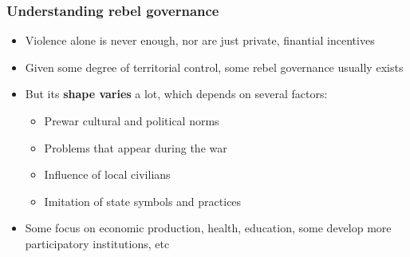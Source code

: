 \documentclass[utf8, xcolor=dvipsnames]{beamer}
\begin{document}
\begin{frame}
\frametitle{Understanding rebel governance}
\centering

\begin{itemize}[<+->]
  \item Violence alone is never enough, nor are just private, finantial incentives
  \item Given some degree of territorial control, some rebel governance usually exists
  \item But its \textbf{shape varies} a lot, which depends on several factors:
  \begin{itemize}
    \item Prewar cultural and political norms
    \item Problems that appear during the war
    \item Influence of local civilians
    \item Imitation of state symbols and practices
  \end{itemize}
  \item Some focus on economic production, health, education, some develop more participatory institutions, etc
\end{itemize}

\end{frame}
\end{document}
